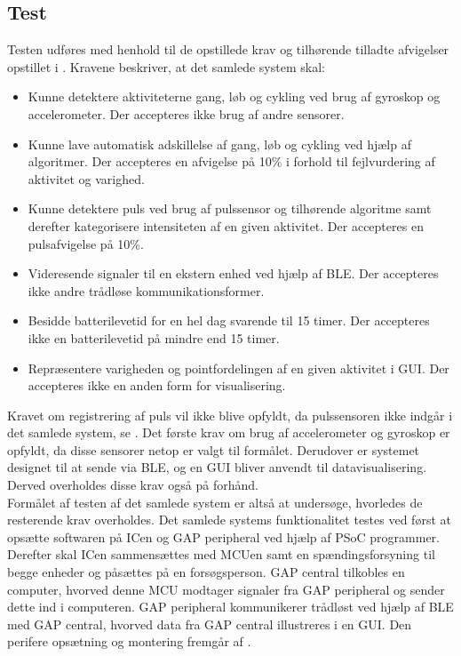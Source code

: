 \subsection{Test}
Testen udføres med henhold til de opstillede krav og tilhørende tilladte afvigelser opstillet i . Kravene beskriver, at det samlede system skal:
\begin{itemize}
	\item Kunne detektere aktiviteterne gang, løb og cykling ved brug af gyroskop og accelerometer. Der accepteres ikke brug af andre sensorer.
	\item Kunne lave automatisk adskillelse af gang, løb og cykling ved hjælp af algoritmer. Der accepteres en afvigelse på 10\% i forhold til fejlvurdering af aktivitet og varighed.
	\item Kunne detektere puls ved brug af pulssensor og tilhørende algoritme samt derefter kategorisere intensiteten af en given aktivitet. Der accepteres en pulsafvigelse på 10\%.
	\item Videresende signaler til en ekstern enhed ved hjælp af BLE. Der accepteres ikke andre trådløse kommunikationsformer.
	\item Besidde batterilevetid for en hel dag svarende til 15 timer. Der accepteres ikke en batterilevetid på mindre end 15 timer.
	\item Repræsentere varigheden og pointfordelingen af en given aktivitet i GUI. Der accepteres ikke en anden form for visualisering. 
\end{itemize}
Kravet om registrering af puls vil ikke blive opfyldt, da pulssensoren ikke indgår i det samlede system, se . Det første krav om brug af accelerometer og gyroskop er opfyldt, da disse sensorer netop er valgt til formålet. Derudover er systemet designet til at sende via BLE, og en GUI bliver anvendt til datavisualisering. Derved overholdes disse krav også på forhånd. \\
Formålet af testen af det samlede system er altså at undersøge, hvorledes de resterende krav overholdes. Det samlede systems funktionalitet testes ved først at opsætte softwaren på ICen og GAP peripheral ved hjælp af PSoC programmer. Derefter skal ICen sammensættes med MCUen samt en spændingsforsyning til begge enheder og påsættes på en forsøgsperson. GAP central tilkobles en computer, hvorved denne MCU modtager signaler fra GAP peripheral og sender dette ind i computeren. GAP peripheral kommunikerer trådløst ved hjælp af BLE med GAP central, hvorved data fra GAP central illustreres i en GUI. Den perifere opsætning og montering fremgår af .
